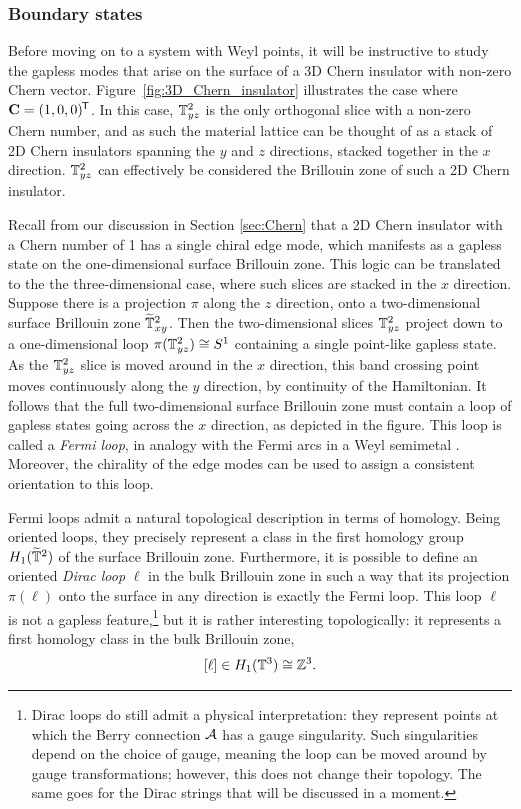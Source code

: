 \subsubsection{Boundary states}

Before moving on to a system with Weyl points, it will be instructive to study the gapless modes that arise on the surface of a 3D Chern insulator with non-zero Chern vector. Figure~\ref{fig:3D_Chern_insulator} illustrates the case where $\vb{C} = (1,0,0)^{\mkern-1.5mu\mathsf{T}}$. In this case, $\mathbb{T}_{yz}^2$ is the only orthogonal slice with a non-zero Chern number, and as such the material lattice can be thought of as a stack of 2D Chern insulators spanning the $y$ and $z$ directions, stacked together in the $x$ direction. $\mathbb{T}_{yz}^2$ can effectively be considered the Brillouin zone of such a 2D Chern insulator.

Recall from our discussion in Section \ref{sec:Chern} that a 2D Chern insulator with a Chern number of 1 has a single chiral edge mode, which manifests as a gapless state on the one-dimensional surface Brillouin zone. This logic can be translated to the the three-dimensional case, where such slices are stacked in the $x$ direction. Suppose there is a projection $\pi$ along the $z$ direction, onto a two-dimensional surface Brillouin zone $\widetilde{\mathbb{T}}_{xy}^2$. Then the two-dimensional slices $\mathbb{T}_{yz}^2$ project down to a one-dimensional loop $\pi(\mathbb{T}_{yz}^2)\cong S^1$ containing a single point-like gapless state. As the $\mathbb{T}_{yz}^2$ slice is moved around in the $x$ direction, this band crossing point moves continuously along the $y$ direction, by continuity of the Hamiltonian. It follows that the full two-dimensional surface Brillouin zone must contain a loop of gapless states going across the $x$ direction, as depicted in the figure. This loop is called a \emph{Fermi loop}, in analogy with the Fermi arcs in a Weyl semimetal . Moreover, the chirality of the edge modes can be used to assign a consistent orientation to this loop. %

Fermi loops admit a natural topological description in terms of homology. Being oriented loops, they precisely represent a class in the first homology group $H_1(\widetilde{\mathbb{T}}^2)$ of the surface Brillouin zone. Furthermore, it is possible to define an oriented \emph{Dirac loop} $\ell$ in the bulk Brillouin zone in such a way that its projection $\pi(\ell)$ onto the surface in any direction is exactly the Fermi loop. This loop $\ell$ is not a gapless feature,\footnote{ %
	Dirac loops do still admit a physical interpretation: they represent points at which the Berry connection $\mathcal{A}$ has a gauge singularity. Such singularities depend on the choice of gauge, meaning the loop can be moved around by gauge transformations; however, this does not change their topology. The same goes for the Dirac strings that will be discussed in a moment.}
but it is rather interesting topologically: it represents a first homology class in the bulk Brillouin zone,
\[
	[\ell]\in H_1(\mathbb{T}^3)\cong\mathbb{Z}^3.
\]

